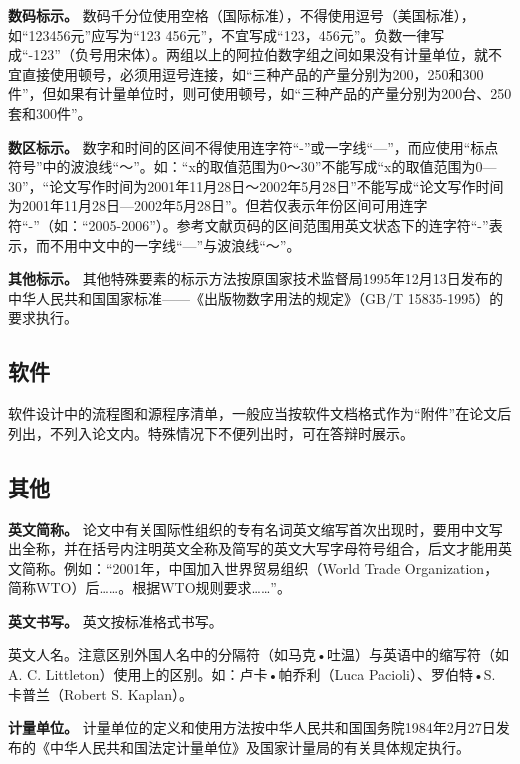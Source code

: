 \documentclass[singlesided]{Style/ucasthesis}%
\begin{document}
\textbf{数码标示。} 数码千分位使用空格（国际标准），不得使用逗号（美国标准），如``123456元''应写为``123 456元''，不宜写成``123，456元''。负数一律写成``-123''（负号用宋体）。两组以上的阿拉伯数字组之间如果没有计量单位，就不宜直接使用顿号，必须用逗号连接，如``三种产品的产量分别为200，250和300件''，但如果有计量单位时，则可使用顿号，如``三种产品的产量分别为200台、250套和300件''。

\textbf{数区标示。} 数字和时间的区间不得使用连字符``-''或一字线``---''，而应使用``标点符号''中的波浪线``～''。如：``x的取值范围为0～30''不能写成``x的取值范围为0---30''，``论文写作时间为2001年11月28日～2002年5月28日''不能写成``论文写作时间为2001年11月28日---2002年5月28日''。但若仅表示年份区间可用连字符``-''（如：``2005-2006''）。参考文献页码的区间范围用英文状态下的连字符``-''表示，而不用中文中的一字线``---''与波浪线``～''。

\textbf{其他标示。} 其他特殊要素的标示方法按原国家技术监督局1995年12月13日发布的中华人民共和国国家标准------《出版物数字用法的规定》（GB/T 15835-1995）的要求执行。

\hypertarget{section-30}{%
\subsection{软件}\label{section-30}}

软件设计中的流程图和源程序清单，一般应当按软件文档格式作为``附件''在论文后列出，不列入论文内。特殊情况下不便列出时，可在答辩时展示。

\hypertarget{section-31}{%
\subsection{其他}\label{section-31}}

\textbf{英文简称。} 论文中有关国际性组织的专有名词英文缩写首次出现时，要用中文写出全称，并在括号内注明英文全称及简写的英文大写字母符号组合，后文才能用英文简称。例如：``2001年，中国加入世界贸易组织（World Trade Organization，简称WTO）后\ldots{}\ldots{}。根据WTO规则要求\ldots{}\ldots{}''。

\textbf{英文书写。} 英文按标准格式书写。

英文人名。注意区别外国人名中的分隔符（如马克•吐温）与英语中的缩写符（如A. C. Littleton）使用上的区别。如：卢卡•帕乔利（Luca Pacioli）、罗伯特•S. 卡普兰（Robert S. Kaplan）。

\textbf{计量单位。} 计量单位的定义和使用方法按中华人民共和国国务院1984年2月27日发布的《中华人民共和国法定计量单位》及国家计量局的有关具体规定执行。
\end{document}
